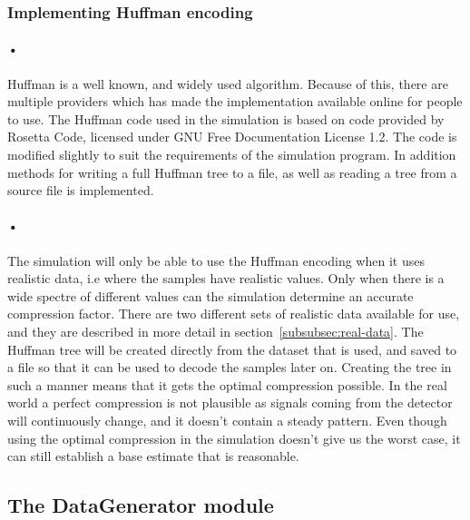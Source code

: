 \documentclass[a4paper, 12pt]{report}\dfrac{\right }{•}
\begin{document}
\begin{minipage}{\linewidth}

\end{minipage}

\subsubsection{Implementing Huffman encoding}

\paragraph{•}
Huffman is a well known, and widely used algorithm.
Because of this, there are multiple providers which has made the implementation available online for people to use.
The Huffman code used in the simulation is based on code provided by Rosetta Code, licensed under GNU Free Documentation License 1.2\cite{rosetta}\cite{gnu}.
The code is modified slightly to suit the requirements of the simulation program.
In addition methods for writing a full Huffman tree to a file, as well as reading a tree from a source file is implemented.

\paragraph{•}
The simulation will only be able to use the Huffman encoding when it uses realistic data, i.e where the samples have realistic values.
Only when there is a wide spectre of different values can the simulation determine an accurate compression factor.
There are two different sets of realistic data available for use, and they are described in more detail in section~\ref{subsubsec:real-data}.
The Huffman tree will be created directly from the dataset that is used, and saved to a file so that it can be used to decode the samples later on.
Creating the tree in such a manner means that it gets the optimal compression possible.
In the real world a perfect compression is not plausible as signals coming from the detector will continuously change, and it doesn't contain a steady pattern.
Even though using the optimal compression in the simulation doesn't give us the worst case, it can still establish a base estimate that is reasonable.

\subsection{The DataGenerator module}
\end{document}
